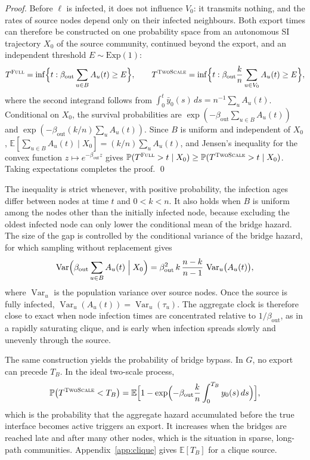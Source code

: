 \documentclass[a4paper,fleqn]{cas-sc}
\newcommand{\ibar}{\bar{y}}
\newcommand{\Exp}{\mathrm{Exp}}
\newcommand{\Full}{\textup{\textsc{Full}}}
\newcommand{\TS}{\textup{\textsc{TwoScale}}}
\begin{document}
\begin{proof}
Before $\ell$ is infected, it does not influence $V_0$: it transmits nothing, and the rates of source nodes depend only on their infected neighbours. Both export times can therefore be constructed on one probability space from an autonomous SI trajectory $X_0$ of the source community, continued beyond the export, and an independent threshold $E\sim\Exp(1)$:
\[
T^{\Full}=\inf\Bigl\{t:\beta_{\mathrm{out}}\sum_{u\in B}A_u(t)\ge E\Bigr\},\qquad
T^{\TS}=\inf\Bigl\{t:\beta_{\mathrm{out}}\frac{k}{n}\sum_{u\in V_0}A_u(t)\ge E\Bigr\},
\]
where the second integrand follows from $\int_0^t\ibar_0(s)\,ds=n^{-1}\sum_uA_u(t)$. Conditional on $X_0$, the survival probabilities are $\exp(-\beta_{\mathrm{out}}\sum_{u\in B}A_u(t))$ and $\exp(-\beta_{\mathrm{out}}(k/n)\sum_uA_u(t))$. Since $B$ is uniform and independent of $X_0$, $\mathbb{E}[\sum_{u\in B}A_u(t)\mid X_0]=(k/n)\sum_uA_u(t)$, and Jensen's inequality for the convex function $z\mapsto e^{-\beta_{\mathrm{out}}z}$ gives $\mathbb{P}(T^{\Full}>t\mid X_0)\ge\mathbb{P}(T^{\TS}>t\mid X_0)$. Taking expectations completes the proof. \qed
\end{proof}

The inequality is strict whenever, with positive probability, the infection ages differ between nodes at time $t$ and $0<k<n$. It also holds when $B$ is uniform among the nodes other than the initially infected node, because excluding the oldest infected node can only lower the conditional mean of the bridge hazard. The size of the gap is controlled by the conditional variance of the bridge hazard, for which sampling without replacement gives
\begin{equation}
\label{eq:hazard_variance}
\operatorname{Var}\Bigl(\beta_{\mathrm{out}}\sum_{u\in B}A_u(t)\Bigm| X_0\Bigr)=\beta_{\mathrm{out}}^2\,k\,\frac{n-k}{n-1}\,\operatorname{Var}_u\bigl(A_u(t)\bigr),
\end{equation}
where $\operatorname{Var}_u$ is the population variance over source nodes. Once the source is fully infected, $\operatorname{Var}_u(A_u(t))=\operatorname{Var}_u(\tau_u)$. The aggregate clock is therefore close to exact when node infection times are concentrated relative to $1/\beta_{\mathrm{out}}$, as in a rapidly saturating clique, and is early when infection spreads slowly and unevenly through the source.

The same construction yields the probability of bridge bypass. In $G$, no export can precede $T_B$. In the ideal two-scale process,
\begin{equation}
\label{eq:bypass}
\mathbb{P}\bigl(T^{\TS}<T_B\bigr)=\mathbb{E}\Bigl[1-\exp\Bigl(-\beta_{\mathrm{out}}\frac{k}{n}\int_0^{T_B}y_0(s)\,ds\Bigr)\Bigr],
\end{equation}
which is the probability that the aggregate hazard accumulated before the true interface becomes active triggers an export. It increases when the bridges are reached late and after many other nodes, which is the situation in sparse, long-path communities. Appendix~\ref{app:clique} gives $\mathbb{E}[T_B]$ for a clique source.
\end{document}
